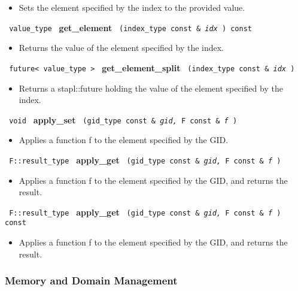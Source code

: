 \begin{itemize}
\item
Sets the element specified by the index to the provided value.
\end{itemize}
 
\noindent
\texttt{%
value\_type
}
\textbf{get\_element}%
\texttt{%
(index\_type const \&
\textit{idx}%
) const
}

\begin{itemize}
\item
Returns the value of the element specified by the index.
\end{itemize}
 
\noindent
\texttt{%
future< value\_type >
}
\textbf{get\_element\_split}%
\texttt{%
(index\_type const \&
\textit{idx}%
)
}

\begin{itemize}
\item
Returns a stapl::future holding the value of the element specified by the index.
\end{itemize}
 
\noindent
\texttt{%
void
}
\textbf{apply\_set}%
\texttt{%
(gid\_type const \&
\textit{gid,}%
F const \&
\textit{f}%
)
}

\begin{itemize}
\item
Applies a function f to the element specified by the GID.
\end{itemize}
 
\noindent
\texttt{%
F::result\_type
}
\textbf{apply\_get}%
\texttt{%
(gid\_type const \&
\textit{gid,}%
F const \&
\textit{f}%
)
}

\begin{itemize}
\item
Applies a function f to the element specified by the GID, and returns the result.
\end{itemize}
 
\noindent
\texttt{%
F::result\_type
}
\textbf{apply\_get}%
\texttt{%
(gid\_type const \&
\textit{gid,}%
F const \&
\textit{f}%
) const
}

\begin{itemize}
\item
Applies a function f to the element specified by the GID, and returns the result.
\end{itemize}
 
 
\subsubsection{Memory and Domain Management}


